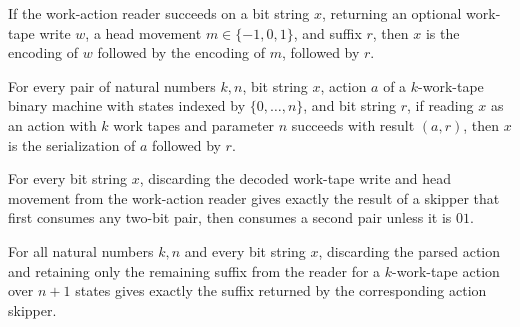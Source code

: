 \begin{lemma}
\label{Turing.codeReadWork_sound}
\leanok
{}
If the work-action reader succeeds on a bit string $x$, returning an optional work-tape
write $w$, a head movement $m\in\{-1,0,1\}$, and suffix $r$, then $x$ is the encoding of
$w$ followed by the encoding of $m$, followed by $r$.
\end{lemma}

\begin{lemma}
\label{Turing.codeReadActionK_sound}
\leanok
{}
For every pair of natural numbers $k,n$, bit string $x$, action $a$ of a $k$-work-tape
binary machine with states indexed by $\{0,\ldots,n\}$, and bit string $r$, if reading
$x$ as an action with $k$ work tapes and parameter $n$ succeeds with result $(a,r)$,
then $x$ is the serialization of $a$ followed by $r$.
\end{lemma}

\begin{lemma}
\label{Turing.codeEraseWork}
\leanok
{}
For every bit string $x$, discarding the decoded work-tape write and head movement from
the work-action reader gives exactly the result of a skipper that first consumes any
two-bit pair, then consumes a second pair unless it is $01$.
\end{lemma}

\begin{lemma}
\label{Turing.codeEraseActionK}
\leanok
{}
For all natural numbers $k,n$ and every bit string $x$, discarding the parsed action and
retaining only the remaining suffix from the reader for a $k$-work-tape action over
$n+1$ states gives exactly the suffix returned by the corresponding action skipper.
\end{lemma}

